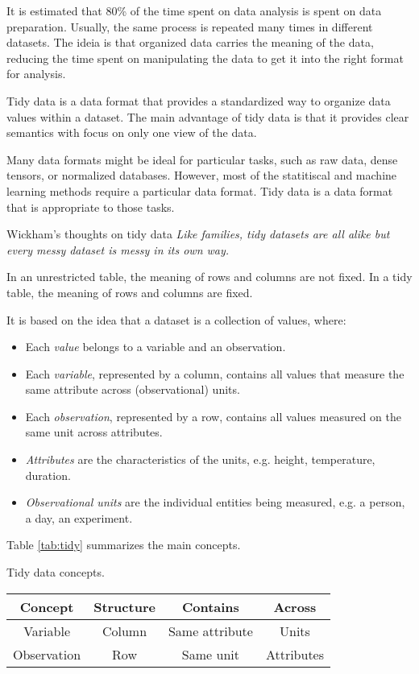 It is estimated that 80\% of the time spent on data analysis is spent on data preparation.
Usually, the same process is repeated many times in different datasets. The ideia is that
organized data carries the meaning of the data, reducing the time spent on manipulating
the data to get it into the right format for analysis.

Tidy data is a data format that provides a standardized way to organize data values within
a dataset.  The main advantage of tidy data is that it provides clear semantics with focus
on only one view of the data.

Many data formats might be ideal for particular tasks, such as raw data, dense tensors, or
normalized databases.  However, most of the statitiscal and machine learning methods
require a particular data format.  Tidy data is a data format that is appropriate to those
tasks.

\begin{mainbox}{Wickham's thoughts on tidy data}
  \em
  Like families, tidy datasets are all alike but every messy dataset is messy in its own
  way.
\end{mainbox}

In an unrestricted table, the meaning of rows and columns are not fixed.  In a tidy table,
the meaning of rows and columns are fixed.

It is based on the idea that a dataset is a collection of values, where:
\begin{itemize}
  \item Each \emph{value} belongs to a variable and an observation.
  \item Each \emph{variable}, represented by a column, contains all values that measure
    the same attribute across (observational) units.
  \item Each \emph{observation}, represented by a row, contains all values measured on the
    same unit across attributes.
  \item \emph{Attributes} are the characteristics of the units, e.g. height, temperature,
    duration.
  \item \emph{Observational units} are the individual entities being measured, e.g. a
    person, a day, an experiment.
\end{itemize}
Table \ref{tab:tidy} summarizes the main concepts.

\begin{tablebox}[label=tab:tidy]{Tidy data concepts.}
  \centering
  \begin{tabular}{cccc}
    \toprule
    \textbf{Concept} & \textbf{Structure} & \textbf{Contains} & \textbf{Across} \\
    \midrule
    Variable & Column & Same attribute & Units \\
    Observation & Row & Same unit & Attributes \\
    \bottomrule
  \end{tabular}
\end{tablebox}

